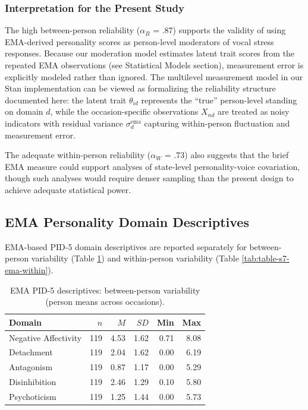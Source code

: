 \documentclass[
  english,
  man,floatsintext]{apa6}
\begin{document}
\subsubsection{Interpretation for the Present Study}\label{interpretation-for-the-present-study}

The high between-person reliability (\(\alpha_B\) = .87) supports the validity of using EMA-derived personality scores as person-level moderators of vocal stress responses. Because our moderation model estimates latent trait scores from the repeated EMA observations (see Statistical Models section), measurement error is explicitly modeled rather than ignored. The multilevel measurement model in our Stan implementation can be viewed as formalizing the reliability structure documented here: the latent trait \(\theta_{id}\) represents the ``true'' person-level standing on domain \(d\), while the occasion-specific observations \(X_{nd}\) are treated as noisy indicators with residual variance \(\sigma_d^{\text{ema}}\) capturing within-person fluctuation and measurement error.

The adequate within-person reliability (\(\alpha_W\) = .73) also suggests that the brief EMA measure could support analyses of state-level personality-voice covariation, though such analyses would require denser sampling than the present design to achieve adequate statistical power.

\subsection{EMA Personality Domain Descriptives}\label{ema-personality-domain-descriptives}

EMA-based PID-5 domain descriptives are reported separately for between-person variability (Table \ref{tab:table-s6-ema-between}) and within-person variability (Table \ref{tab:table-s7-ema-within}).

\begin{table}

\caption{\label{tab:table-s6-ema-between}EMA PID-5 descriptives: between-person variability (person means across occasions).}
\centering
\begin{tabular}[t]{lrrrrr}
\toprule
Domain & $n$ & $M$ & $SD$ & Min & Max\\
\midrule
Negative Affectivity & 119 & 4.53 & 1.62 & 0.71 & 8.08\\
Detachment & 119 & 2.04 & 1.62 & 0.00 & 6.19\\
Antagonism & 119 & 0.87 & 1.17 & 0.00 & 5.29\\
Disinhibition & 119 & 2.46 & 1.29 & 0.10 & 5.80\\
Psychoticism & 119 & 1.25 & 1.44 & 0.00 & 5.73\\
\bottomrule
\end{tabular}
\end{table}
\end{document}
